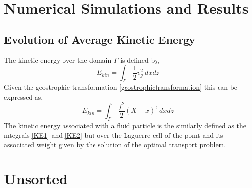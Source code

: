 \chapter{Numerical Simulations and Results \label{results}}
\section{Evolution of Average Kinetic Energy}
The kinetic energy over the domain $\Gamma$ is defined by,
\begin{equation}
	E_{kin} = \int_\Gamma \ \frac{1}{2}v_g^2 \ dxdz
	\label{KE1}
\end{equation}
Given the geostrophic transformation \ref{geostrophictransformation} this can be expressed as,
\begin{equation}
E_{kin} = \int_\Gamma \ \frac{f^2}{2}(X-x)^2 \ dxdz
\label{KE2}
\end{equation}
The kinetic energy associated with a fluid particle is the similarly defined as the integrals \ref{KE1} and \ref{KE2} but over the Laguerre cell of the point and its associated weight given by the solution of the optimal transport problem.
\chapter{Unsorted}
